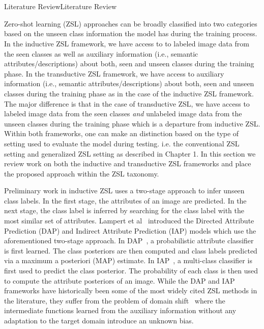 \chapter{}{Literature Review}{Literature Review}

Zero-shot learning (ZSL) approaches can be broadly classified into two categories based on the unseen class information the model has during the training process. In the inductive ZSL framework, we have access to to labeled image data from the seen classes as well as auxiliary information (i.e., semantic attributes/descriptions) about both, seen and unseen classes during the training phase. In the transductive ZSL framework, we have access to auxiliary information (i.e., semantic attributes/descriptions) about both, seen and unseen classes during the training phase as in the case of the inductive ZSL framework. The major difference is that in the case of transductive ZSL, we have access to labeled image data from the seen classes \textit{and} unlabeled image data from the unseen classes during the training phase which is a departure from inductive ZSL. Within both frameworks, one can make an distinction based on the type of setting used to evaluate the model during testing. i.e. the conventional ZSL setting and generalized ZSL setting as described in Chapter 1. In this section we review work on both the inductive and transductive ZSL frameworks and place the proposed approach within the ZSL taxonomy.

\par
\medskip

Preliminary work in inductive ZSL uses a two-stage approach to infer unseen class labels. In the first stage, the attributes of an image are predicted. In the next stage, the class label is inferred by searching for the class label with the most similar set of attributes. Lampert et al~\cite{DAP} introduced the Directed Attribute Prediction (DAP) and Indirect Attribute Prediction (IAP) models  which use the aforementioned two-stage approach. In DAP~\cite{DAP}, a probabilistic attribute classifier is first learned. The class posteriors are then computed and class labels predicted via a maximum a posteriori (MAP) estimate. In IAP~\cite{DAP}, a multi-class classifier is first used to predict the class posterior. The probability of each class is then used to compute the attribute posteriors of an image. While the DAP and IAP frameworks have historically been some of the most widely cited ZSL methods in the literature, they suffer from the problem of domain shift~\cite{domainshift} where the intermediate functions learned from the auxiliary information without any adaptation to the target domain introduce an unknown bias.

